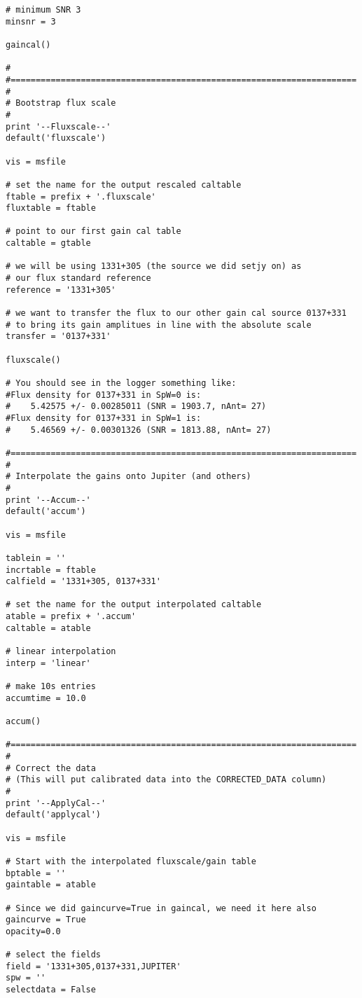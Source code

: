 \begin{verbatim}
# minimum SNR 3
minsnr = 3

gaincal()

#
#=====================================================================
#
# Bootstrap flux scale
#
print '--Fluxscale--'
default('fluxscale')

vis = msfile

# set the name for the output rescaled caltable
ftable = prefix + '.fluxscale'
fluxtable = ftable

# point to our first gain cal table
caltable = gtable

# we will be using 1331+305 (the source we did setjy on) as
# our flux standard reference
reference = '1331+305'

# we want to transfer the flux to our other gain cal source 0137+331
# to bring its gain amplitues in line with the absolute scale
transfer = '0137+331'

fluxscale()

# You should see in the logger something like:
#Flux density for 0137+331 in SpW=0 is: 
#    5.42575 +/- 0.00285011 (SNR = 1903.7, nAnt= 27)
#Flux density for 0137+331 in SpW=1 is: 
#    5.46569 +/- 0.00301326 (SNR = 1813.88, nAnt= 27)

#=====================================================================
#
# Interpolate the gains onto Jupiter (and others)
#
print '--Accum--'
default('accum')

vis = msfile

tablein = ''
incrtable = ftable
calfield = '1331+305, 0137+331'

# set the name for the output interpolated caltable
atable = prefix + '.accum'
caltable = atable

# linear interpolation
interp = 'linear'

# make 10s entries
accumtime = 10.0

accum()

#=====================================================================
#
# Correct the data
# (This will put calibrated data into the CORRECTED_DATA column)
#
print '--ApplyCal--'
default('applycal')

vis = msfile

# Start with the interpolated fluxscale/gain table
bptable = ''
gaintable = atable

# Since we did gaincurve=True in gaincal, we need it here also
gaincurve = True
opacity=0.0

# select the fields
field = '1331+305,0137+331,JUPITER'
spw = ''
selectdata = False


\end{verbatim}
